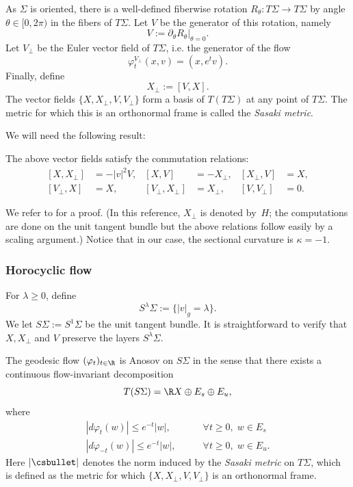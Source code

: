 As $\Sigma$ is oriented, there is a well-defined fiberwise rotation $R_\theta : T\Sigma \to T\Sigma$ by angle $\theta \in [0,2\pi)$ in the fibers of $T\Sigma$. Let $V$ be the generator of this rotation, namely
\[
V := \partial_\theta R_\theta|_{\theta = 0}.
\]
Let $V_\perp$ be the Euler vector field of $T\Sigma$, i.e. the generator of the flow
\begin{equation}
\label{equation:flot-vperp}
\varphi_t^{V_\perp}(x,v) = (x,e^tv).
\end{equation}
Finally, define
\[
X_\perp := [V,X].
\]
The vector fields $\{X,X_\perp,V,V_\perp\}$ form a basis of $T(T\Sigma)$ at any point of $T\Sigma$. The metric for which this is an orthonormal frame is called the \emph{Sasaki metric}.

We will need the following result:

\begin{lemma}
The above vector fields satisfy the commutation relations:
\begin{equation}
\label{equation:commutator-relations}
\begin{aligned}
[X,X_\perp] &= - |v|^2 V,& [X,V] &=-X_\perp, & [X_\perp,V] &= X, \\
[V_\perp,X] &= X, & [V_\perp, X_\perp] &= X_\perp, & [V,V_\perp] &= 0.
\end{aligned}
\end{equation}
\end{lemma}

We refer to \cite[Lem.\,15.2.1]{Lefeuvre-book} for a proof. (In this reference, $X_\perp$ is denoted by~$H$; the computations are done on the unit tangent bundle but the above relations follow easily by a scaling argument.) Notice that in our case, the sectional curvature is $\kappa = -1$.

\subsubsection{Horocyclic flow} For $\lambda \geq 0$, define
\[
S^\lambda\Sigma := \{|v|_g=\lambda\}.
\]
We let $S\Sigma := S^{1}\Sigma$ be the unit tangent bundle. It is straightforward to verify that $X,X_\perp$ and $V$ preserve the layers $S^\lambda\Sigma$.

The geodesic flow $(\varphi_t)_{t \in \R}$ is Anosov on $S\Sigma$ in the sense that {\color{black}there exists a continuous flow-invariant decomposition}
\[
T(S \Sigma) = \R X \oplus E_s \oplus E_u,
\]
where
\[
\begin{split}
|d\varphi_t(w)| \leq e^{-t} |w|, &\qquad \forall t \geq 0,\; w \in E_s \\
|d\varphi_{-t}(w)| \leq e^{-t} |w|, &\qquad \forall t \geq 0,\; w \in E_u.
\end{split}
\]
Here $|\csbullet|$ denotes the norm induced by the \emph{Sasaki metric} on $T\Sigma$, which is defined as the metric for which $\{X,X_\perp,V,V_\perp\}$ is an orthonormal frame.

